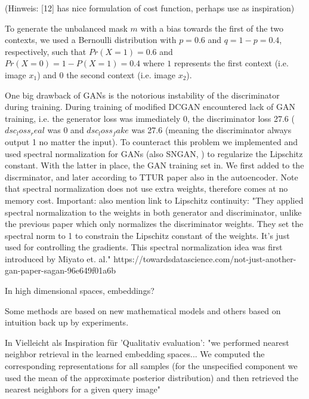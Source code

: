 \documentclass[11pt,a4paper]{article}
\begin{document}
(Hinweis: [12] has nice formulation of cost function, perhaps use as inspiration)

\par To generate the unbalanced mask $m$ with a bias towards the first of the two contexts, we used a Bernoulli distribution with $p=0.6$ and $q=1-p=0.4$, respectively, such that $Pr(X=1)=0.6$ and $Pr(X=0)=1-P(X=1)=0.4$ where $1$ represents the first context (i.e. image $x_1$) and $0$ the second context (i.e. image $x_2$).

\par One big drawback of GANs is the notorious instability of the discriminator during training. During training of modified DCGAN encountered lack of GAN training, i.e. the generator loss was immediately 0, the discriminator loss 27.6 ($dsc_loss_real$ was 0 and $dsc_loss_fake$ was 27.6 (meaning the discriminator always output 1 no matter the input). To counteract this problem we implemented and used spectral normalization for GANs (also SNGAN, \cite{1802.05957}) to regularize the Lipschitz constant. With the latter in place, the GAN training set in. We first added to the discrminator, and later according to TTUR paper also in the autoencoder. Note that spectral normalization does not use extra weights, therefore comes at no memory cost.
Important: also mention link to Lipschitz continuity: "They applied spectral normalization to the weights in both generator and discriminator, unlike the previous paper which only normalizes the discriminator weights. They set the spectral norm to 1 to constrain the Lipschitz constant of the weights. It’s just used for controlling the gradients. This spectral normalization idea was first introduced by Miyato et. al." https://towardsdatascience.com/not-just-another-gan-paper-sagan-96e649f01a6b

\par In high dimensional spaces, embeddings?

\par Some methods are based on new mathematical models and others based on intuition back up by experiments.

\par In \cite{1611.03383} Vielleicht als Inspiration für 'Qualitativ evaluation': "we performed nearest neighbor retrieval in the learned embedding spaces... We computed the corresponding representations for all samples (for the unspecified component we used the mean of the approximate posterior distribution) and then retrieved the nearest neighbors for a given query image"
\end{document}
